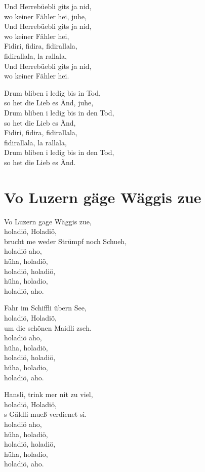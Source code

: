 \documentclass[
  letterpaper,
  a5paper]{memoir}
\begin{document}
Und Herrebüebli git\textquotesingle s ja nid,\\
wo keiner Fähler hei, juhe,\\
Und Herrebüebli git\textquotesingle s ja nid,\\
wo keiner Fähler hei,\\
Fidiri, fidira, fidirallala,\\
fidirallala, la rallala,\\
Und Herrebüebli git\textquotesingle s ja nid,\\
wo keiner Fähler hei.

Drum bliben i ledig bis in Tod,\\
so het die Lieb es Änd, juhe,\\
Drum bliben i ledig bis in den Tod,\\
so het die Lieb es Änd,\\
Fidiri, fidira, fidirallala,\\
fidirallala, la rallala,\\
Drum bliben i ledig bis in den Tod,\\
so het die Lieb es Änd.

\hypertarget{vo-luzern-guxe4ge-wuxe4ggis-zue}{%
\chapter{Vo Luzern gäge Wäggis
zue}\label{vo-luzern-guxe4ge-wuxe4ggis-zue}}

Vo Luzern gage Wäggis zue,\\
holadiö, Holadiö,\\
brucht me weder Strümpf noch Schueh,\\
holadiö aho,\\
hüha, holadiö,\\
holadiö, holadiö,\\
hüha, holadio,\\
holadiö, aho.

Fahr im Schiffli übern See,\\
holadiö, Holadiö,\\
um die schönen Maidli zseh.\\
holadiö aho,\\
hüha, holadiö,\\
holadiö, holadiö,\\
hüha, holadio,\\
holadiö, aho.

Hansli, trink mer nit zu viel,\\
holadiö, Holadiö,\\
\textquotesingle s Gäldli mueß verdienet si.\\
holadiö aho,\\
hüha, holadiö,\\
holadiö, holadiö,\\
hüha, holadio,\\
holadiö, aho.
\end{document}
